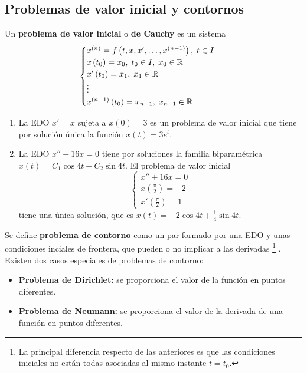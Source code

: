 \subsection{Problemas de valor inicial y contornos}
\begin{definition}
Un \textbf{problema de valor inicial} o \textbf{de Cauchy} es un sistema
\[
\begin{cases}
x^{\left(n\right)} = f\left(t, x, x', \ldots, x^{\left(n-1\right)}\right), \; t\in I \\
x\left(t_{0}\right) = x_{0}, \; t_{0} \in I, \; x_{0} \in \mathbb{R}\\
x'\left(t_{0}\right) = x_{1} , \; x_{1} \in \mathbb{R}\\
\vdots \\
x^{\left(n-1\right)}\left(t_{0}\right)= x_{n-1}, \; x_{n-1} \in \mathbb{R}
\end{cases}
.\]
\end{definition}
\begin{eg}
\begin{enumerate}
\item La EDO $\displaystyle x' = x $ sujeta a $\displaystyle x\left(0\right) = 3 $ es un problema de valor inicial que tiene por solución única la función $\displaystyle x\left(t\right) = 3e^{t} $.
\item La EDO $\displaystyle x'' + 16x = 0 $ tiene por soluciones la familia biparamétrica $\displaystyle x\left(t\right) = C_{1}\cos4t + C_{2}\sin4t $. El problema de valor inicial
	\[
	\begin{cases}
	x'' + 16x = 0 \\
	x\left(\frac{\pi }{2}\right) = - 2 \\
	x'\left(\frac{\pi }{2}\right) = 1
	\end{cases}
	\]
tiene una única solución, que es $\displaystyle x\left(t\right) = -2\cos4t + \frac{1}{4}\sin4t $. 	
\end{enumerate}
\end{eg}
\begin{definition}
Se define \textbf{problema de contorno} como un par formado por una EDO y unas condiciones inciales de frontera, que pueden o no implicar a las derivadas \footnote{La principal diferencia respecto de las anteriores es que las condiciones iniciales no están todas asociadas al mismo instante $\displaystyle t = t_{0} $.} . Existen dos casos especiales de problemas de contorno:
\begin{itemize}
\item \textbf{Problema de Dirichlet:} se proporciona el valor de la función en puntos diferentes. 
\item \textbf{Problema de Neumann:} se proporciona el valor de la derivada de una función en puntos diferentes. 
\end{itemize}
\end{definition}
